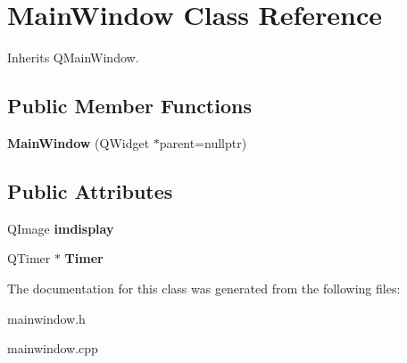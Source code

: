 \hypertarget{class_main_window}{}\section{Main\+Window Class Reference}
\label{class_main_window}


Inherits Q\+Main\+Window.

\subsection*{Public Member Functions}
\begin{DoxyCompactItemize}
\item 
\mbox{\label{class_main_window_a996c5a2b6f77944776856f08ec30858d}} 
{\bfseries Main\+Window} (Q\+Widget $\ast$parent=nullptr)
\end{DoxyCompactItemize}
\subsection*{Public Attributes}
\begin{DoxyCompactItemize}
\item 
\mbox{\label{class_main_window_a77c821305de94141fc8778681420518e}} 
Q\+Image {\bfseries imdisplay}
\item 
\mbox{\label{class_main_window_adcc825ccc7505cdd484e342f1244e5f6}} 
Q\+Timer $\ast$ {\bfseries Timer}
\end{DoxyCompactItemize}


The documentation for this class was generated from the following files\+:\begin{DoxyCompactItemize}
\item 
mainwindow.\+h\item 
mainwindow.\+cpp\end{DoxyCompactItemize}
